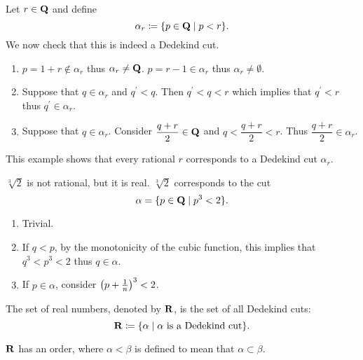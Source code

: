 \begin{example}
Let $r\in\mathbf Q$ and define
\[ \alpha_r\coloneqq\{p\in\mathbf Q\mid p<r\}. \]
We now check that this is indeed a Dedekind cut.
\begin{enumerate}[label=(\roman*)]
\item $p=1+r\notin\alpha_r$ thus $\alpha_r\neq\mathbf Q$. $p=r-1\in\alpha_r$ thus $\alpha_r\neq\emptyset$.

\item Suppose that $q\in\alpha_r$ and $q^\prime<q$. Then $q^\prime<q<r$ which implies that $q^\prime<r$ thus $q^\prime\in\alpha_r$.

\item Suppose that $q\in\alpha_r$. Consider $\dfrac{q+r}{2}\in\mathbf Q$ and $q<\dfrac{q+r}{2}<r$. Thus $\dfrac{q+r}{2}\in\alpha_r$.
\end{enumerate}
\end{example}

This example shows that every rational $r$ corresponds to a Dedekind cut $\alpha_r$.

\begin{example}
$\sqrt[3]{2}$ is not rational, but it is real. $\sqrt[3]{2}$ corresponds to the cut
\[ \alpha=\{p\in\mathbf Q\mid p^3<2\}. \]
\begin{enumerate}[label=(\roman*)]
\item Trivial.
\item If $q<p$, by the monotonicity of the cubic function, this implies that $q^3<p^3<2$ thus $q\in\alpha$.
\item If $p\in\alpha$, consider $\left(p+\frac{1}{n}\right)^3<2$.
\end{enumerate}
\end{example}

\begin{definition*}
The set of real numbers, denoted by $\mathbf R$, is the set of all Dedekind cuts:
\[\mathbf R\coloneqq\{\alpha\mid\alpha\text{ is a Dedekind cut}\}.\]
\end{definition*}

\begin{proposition*}
$\mathbf R$ has an order, where $\alpha<\beta$ is defined to mean that $\alpha\subset\beta$.
\end{proposition*}


